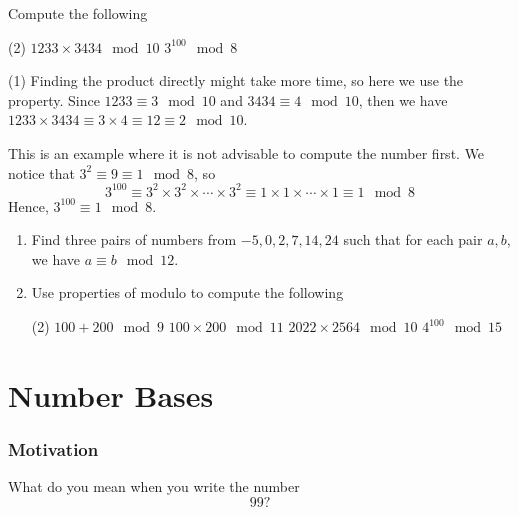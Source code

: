 \begin{frame}[t]
\begin{ex}
Compute the following
\begin{tasks}(2)
\task $1233 \times 3434 \mod 10$
\task $3^{100} \mod 8$
\end{tasks}
\end{ex}
\begin{sol}
\begin{tasks}(1)
\task Finding the product directly might take more time, so here we use the property. Since $1233 \equiv 3 \mod 10$ and $3434 \equiv 4 \mod 10$, then we have $1233 \times 3434 \equiv 3 \times 4 \equiv 12 \equiv 2 \mod 10$.

\task This is an example where it is not advisable to compute the number first. We notice that $3^2 \equiv 9 \equiv 1 \mod 8$, so
\[ 3^{100} \equiv 3^2 \times 3^2 \times \cdots \times 3^2 \equiv 1 \times 1 \times \cdots \times 1 \equiv 1 \mod 8\]
Hence, $3^{100} \equiv 1 \mod 8$.
\end{tasks}
\end{sol}
\end{frame}

\begin{frame}
\begin{exercisebox}{}{}
\begin{enumerate}
\item Find three pairs of numbers from $-5,0,2,7,14,24$ such that for each pair $a,b$, we have $a \equiv b \mod 12$.
\item Use properties of modulo to compute the following 
\begin{tasks}(2)
\task $100 + 200 \mod 9$
\task $100 \times 200 \mod 11$
\task $2022 \times 2564 \mod 10$
\task $4^{100} \mod 15$
\end{tasks}
\end{enumerate}
\end{exercisebox}
\end{frame}



\section{Number Bases}
\frame{\sectionpage}

\begin{frame}
\frametitle{Motivation}
What do you mean when you write the number 
\[99?\]

\end{frame}



